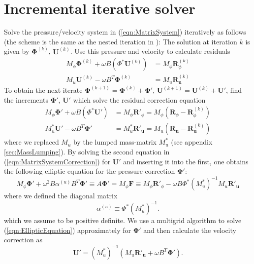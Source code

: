 \documentclass[12pt]{article}
\renewcommand{\vec}[1]{\boldsymbol{#1}}
\begin{document}
\section{Incremental iterative solver}
Solve the pressure/velocity system in (\ref{eqn:MatrixSystem}) iteratively as follows (the scheme is the same as the nested iteration in \cite{Wilson2010}):
The solution at iteration $k$ is given by $\vec{\Phi}^{(k)}$, $\vec{U}^{(k)}$.
 Use this pressure and velocity to calculate residuals
\begin{equation}
 \begin{aligned}
  M_{\phi} \vec{\Phi}^{(k)} + \omega B (\Phi^* \vec{U}^{(k)}) &= M_{\phi}\vec{R}^{(k)}_\phi \\
  M_{u} \vec{U}^{(k)} - \omega B^T \vec{\Phi}^{(k)} &= M_u \vec{R}^{(k)}_{\vec{u}}
 \end{aligned}
\end{equation}
To obtain the next iterate $\vec{\Phi}^{(k+1)} = \vec{\Phi}^{(k)}+\vec{\Phi}'$, $\vec{U}^{(k+1)} = \vec{U}^{(k)}+\vec{U}'$, find the increments $\vec{\Phi}'$, $\vec{U}'$ which solve the residual correction equation
\begin{equation}
 \begin{aligned}
  M_{\phi} \vec{\Phi}' + \omega B (\Phi^* \vec{U}') &= M_{\phi}\vec{R}'_\phi
= M_\phi\left(\vec{R}_\phi-\vec{R}^{(k)}_\phi\right)\\
  M^*_{u} \vec{U}' - \omega B^T \vec{\Phi}' &= M^*_u \vec{R}'_{\vec{u}}
= {M_u} \left(\vec{R}_{\vec{u}}-\vec{R}^{(k)}_{\vec{u}}\right)
 \end{aligned}
\label{eqn:MatrixSystemCorrection}
\end{equation}
where we replaced $M_u$ by the lumped mass-matrix $M_u^*$ (see appendix \ref{sec:MassLumping}). By solving the second equation in (\ref{eqn:MatrixSystemCorrection}) for $\vec{U}'$ and inserting it into the first, one obtains the following elliptic equation for the pressure correction $\vec{\Phi}'$:
\begin{equation}
  M_{\phi}\vec{\Phi}' + \omega^2 B \alpha^{(u)} B^T \vec{\Phi}'
  \equiv A\vec{\Phi}' = M_{\phi}\vec{F} \equiv M_{\phi}\vec{R}'_{\phi}-\omega B \Phi^* \left(M_u^*\right)^{-1}M_u\vec{R}'_{\vec{u}}
\label{eqn:EllipticEquation}
\end{equation}
where we defined the diagonal matrix
\begin{equation}
  \alpha^{(u)} \equiv \Phi^* \left(M_u^*\right)^{-1}.
\end{equation}
which we assume to be positive definite. We use a multigrid algorithm to solve 
(\ref{eqn:EllipticEquation}) approximately for $\vec{\Phi}'$ and then calculate the velocity correction as 
\begin{equation}
  \vec{U}' = \left(M_u^*\right)^{-1}\left(M_u\vec{R}'_{\vec{u}}+ \omega B^T \vec{\Phi}'\right).
\end{equation}
\end{document}

